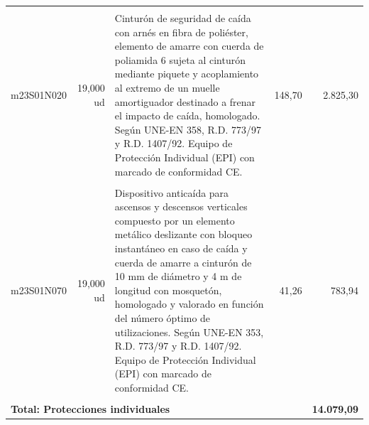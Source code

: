 \documentclass{book}%
\begin{document}
\begin{longtable}{lrlrr}
&&&&\\%
m23S01N020&    19,000 ud&\multicolumn{1}{p{5cm}}{Cinturón de seguridad de caída con arnés en fibra de poliéster, elemento de amarre con cuerda de poliamida 6 sujeta al cinturón mediante piquete y acoplamiento al extremo de un muelle amortiguador destinado a frenar el impacto de caída, homologado. Según UNE{-}EN 358, R.D. 773/97 y R.D. 1407/92. Equipo de Protección Individual (EPI) con marcado de conformidad CE.}&    148,70&2.825,30\\%
&&&&\\%
m23S01N070&    19,000 ud&\multicolumn{1}{p{5cm}}{Dispositivo anticaída para ascensos y descensos verticales compuesto por un elemento metálico deslizante con bloqueo instantáneo en caso de caída y cuerda de amarre a cinturón de 10 mm de diámetro y 4 m de longitud con mosquetón, homologado y valorado en función del número óptimo de utilizaciones. Según UNE{-}EN 353, R.D. 773/97 y R.D. 1407/92. Equipo de Protección Individual (EPI) con marcado de conformidad CE.}&     41,26&783,94\\%
&&&&\\%
\multicolumn{4}{p{8cm}}{\textbf{Total: Protecciones individuales}}&\textbf{14.079,09}\\%
\end{longtable}%
\normalsize

%
\end{document}
